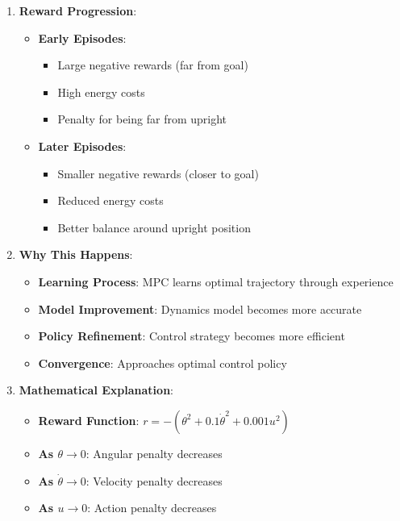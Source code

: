 \begin{itemize}
\begin{enumerate}
        \item \textbf{Reward Progression}:
        \begin{itemize}
            \item \textbf{Early Episodes}:
            \begin{itemize}
                \item Large negative rewards (far from goal)
                \item High energy costs
                \item Penalty for being far from upright
            \end{itemize}
            
            \item \textbf{Later Episodes}:
            \begin{itemize}
                \item Smaller negative rewards (closer to goal)
                \item Reduced energy costs
                \item Better balance around upright position
            \end{itemize}
        \end{itemize}
        
        \item \textbf{Why This Happens}:
        \begin{itemize}
            \item \textbf{Learning Process}: MPC learns optimal trajectory through experience
            \item \textbf{Model Improvement}: Dynamics model becomes more accurate
            \item \textbf{Policy Refinement}: Control strategy becomes more efficient
            \item \textbf{Convergence}: Approaches optimal control policy
        \end{itemize}
        
        \item \textbf{Mathematical Explanation}:
        \begin{itemize}
            \item \textbf{Reward Function}: $r = -(\theta^2 + 0.1\dot{\theta}^2 + 0.001u^2)$
            \item \textbf{As $\theta \to 0$}: Angular penalty decreases
            \item \textbf{As $\dot{\theta} \to 0$}: Velocity penalty decreases
            \item \textbf{As $u \to 0$}: Action penalty decreases
        \end{itemize}
        

\end{enumerate}
\end{itemize}
